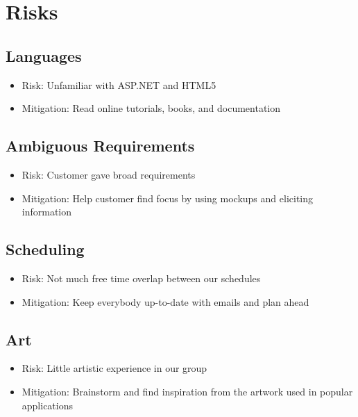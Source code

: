\documentclass[11pt,a4paper,oneside]{article}
\begin{document}
\section{Risks}

\subsection{Languages}

\begin{itemize}
\item Risk: Unfamiliar with ASP.NET and HTML5 
\item Mitigation: Read online tutorials, books, and documentation
\end{itemize}


\subsection{Ambiguous Requirements}

\begin{itemize}
\item Risk: Customer gave broad requirements
\item Mitigation: Help customer find focus by using mockups and eliciting information
\end{itemize}


\subsection{Scheduling}

\begin{itemize}
\item Risk: Not much free time overlap between our schedules
\item Mitigation: Keep everybody up-to-date with emails and plan ahead
\end{itemize}


\subsection{Art}

\begin{itemize}
\item Risk: Little artistic experience in our group
\item Mitigation: Brainstorm and find inspiration from the artwork used in popular applications
\end{itemize}
\end{document}
